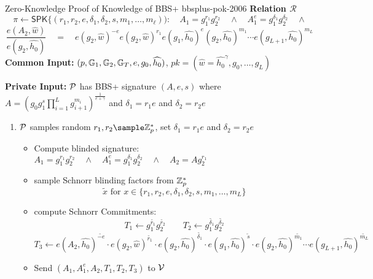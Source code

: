 \begin{protocol}{\cite{hutchison_constant-size_2006} Zero-Knowledge Proof of Knowledge of BBS+ }{bbsplus-pok-2006}
    \textbf{Relation $\mathcal{R}$}
        \[
        \pi \gets \mathsf{SPK}\{(r_1, r_2, e, \delta_1, \delta_2, s, m_1,\ldots,m_{\ell})): \quad A_1 = g_1^{r_1}g_2^{r_2} \quad \wedge \quad A_1^e = g_1^{\delta_1}g_2^{\delta_2} \quad \wedge 
        \]
        \[
        \frac{e(A_2, \widehat{w})}{e(g_2, \widehat{h_0})} \quad = \quad 
        e(g_2,\widehat{w})^{-e}e(g_2,\widehat{w})^{r_1}e(g_1,\widehat{h_0})^e(g_2,\widehat{h_0})^{m_1}\cdots e(g_{L+1},\widehat{h_0})^{m_L}
        \]
    \textbf{Common Input:} $(p, \mathbb{G}_1, \mathbb{G}_2, \mathbb{G}_T, e, g_0, \widehat{h_0})$, $pk = (\hat{w} = \hat{h_0}^{\gamma},  g_0, \ldots, g_{L})$

    \textbf{Private Input:} $\mathcal{P}$ has BBS+ signature $(A,e,s)$ where $A = (g_0g_1^s\prod_{i=1}^{L} g_{i+1}^{m_i})^{\frac{1}{e+\gamma}}$ and $\delta_1 = r_1e$ and $\delta_2 = r_2e$

    \vspace{1em}
    \begin{enumerate}
        \item $\mathcal{P}$ samples random $r_1, r_2 \sample \Z_p^*$, set $\delta_1 = r_1e$ and $\delta_2 = r_2e$
         \begin{itemize}
        \item Compute blinded signature: $A_1 = g_1^{r_1}g_2^{r_2} \quad \wedge \quad A_1^e = g_1^{\delta_1}g_2^{\delta_2} \quad \wedge \quad A_2 = Ag_2^{r_1}$

        \item sample Schnorr blinding factors from $\mathbb{Z}_p^*$
         \[
         \tilde{x} \text{ for } x \in \{r_1, r_2, e, \delta_1, \delta_2, s, m_1,\ldots,m_{L}\}
         \]

        \item compute Schnorr Commitments:
        \[
        T_1 \gets g_1^{\tilde{r_1}}g_2^{\tilde{r_2}} \qquad T_2 \gets g_1^{\tilde{\delta_1}} g_2^{\tilde{\delta_2}} 
        \]
        \[
        T_3 \gets e(A_2, \hat{h_0})^{\tilde{-e}}\cdot e(g_2, \hat{w})^{\tilde{r_1}} \cdot e(g_2, \hat{h_0})^{\tilde{\delta_1}} \cdot e(g_1, \hat{h_0})^{\tilde{s}} \cdot e(g_2, \hat{h_0})^{\tilde{m_1}} \cdots e(g_{L+1}, \hat{h_0})^{\tilde{m_L}}
        \]
        
        \item  Send $(A_1, A_1^e, A_2, T_1, T_2, T_3)$ to $\mathcal{V}$
                
        \end{itemize}


\end{enumerate}
\end{protocol}
